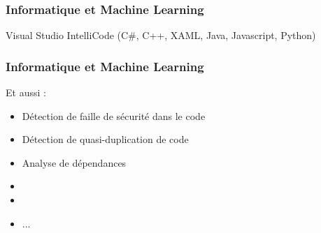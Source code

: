 \begin{frame}
  \frametitle{Informatique et Machine Learning}
  Visual Studio IntelliCode (C\#, C++, XAML, Java, Javascript, Python)
\end{frame}

\begin{frame}
  \frametitle{Informatique et Machine Learning}
  Et aussi :
  \begin{itemize}
  \item Détection de faille de sécurité dans le code
  \item Détection de quasi-duplication de code
  \item Analyse de dépendances
  \item {}
  \item {}
  \item ...
  \end{itemize}
\end{frame}
